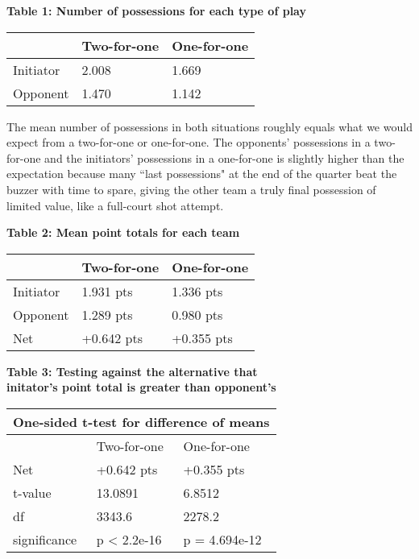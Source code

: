 \documentclass{article}
\begin{document}
\begin{center}
\textbf{Table 1: Number of possessions for each type of play}
\begin{tabular}{|l|l|l|}
\hline
 & Two-for-one & One-for-one \\
\hline
Initiator & 2.008 & 1.669 \\
Opponent & 1.470 & 1.142 \\
\hline
\end{tabular}
\end{center}

The mean number of possessions in both situations roughly equals what we would expect from a two-for-one or one-for-one. The opponents' possessions in a two-for-one and the initiators' possessions in a one-for-one is slightly higher than the expectation because many ``last possessions" at the end of the quarter beat the buzzer with time to spare, giving the other team a truly final possession of limited value, like a full-court shot attempt.

\begin{center}
\textbf{Table 2: Mean point totals for each team}
\begin{tabular}{|l|l|l|}
\hline
 & Two-for-one & One-for-one \\
\hline
Initiator & 1.931 pts & 1.336 pts \\
Opponent & 1.289 pts & 0.980 pts \\
\hline
Net & +0.642 pts & +0.355 pts \\
\hline
\end{tabular}
\end{center}

\begin{center}
\textbf{Table 3: Testing against the alternative that \\ initator's point total is greater than opponent's \\}
\begin{tabular}{|l|l|l|}
\hline
\multicolumn{3}{|c|}{One-sided t-test for difference of means} \\
\hline
 & Two-for-one & One-for-one \\
\hline
Net & +0.642 pts & +0.355 pts \\ \hline
t-value & 13.0891 & 6.8512 \\
df & 3343.6 & 2278.2 \\
significance & p < 2.2e-16 & p = 4.694e-12 \\
\hline
\end{tabular}
\end{center}
\end{document}
